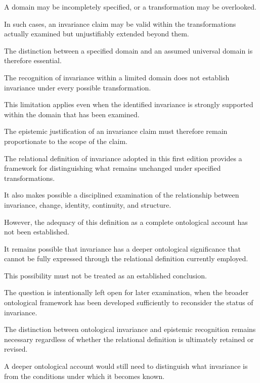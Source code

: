 A domain may be incompletely
specified, or a transformation
may be overlooked.

In such cases, an invariance
claim may be valid within
the transformations actually
examined but unjustifiably
extended beyond them.

The distinction between
a specified domain and an
assumed universal domain
is therefore essential.

The recognition of invariance
within a limited domain does
not establish invariance
under every possible transformation.

This limitation applies even
when the identified invariance
is strongly supported within
the domain that has been
examined.

The epistemic justification
of an invariance claim must
therefore remain proportionate
to the scope of the claim.


The relational definition of
invariance adopted in this
first edition provides a
framework for distinguishing
what remains unchanged under
specified transformations.

It also makes possible a
disciplined examination of
the relationship between
invariance, change, identity,
continuity, and structure.

However, the adequacy of this
definition as a complete
ontological account has not
been established.

It remains possible that
invariance has a deeper
ontological significance
that cannot be fully expressed
through the relational
definition currently employed.

This possibility must not
be treated as an established
conclusion.

The question is intentionally
left open for later examination,
when the broader ontological
framework has been developed
sufficiently to reconsider
the status of invariance.

The distinction between
ontological invariance and
epistemic recognition remains
necessary regardless of whether
the relational definition is
ultimately retained or revised.

A deeper ontological account
would still need to distinguish
what invariance is from the
conditions under which it
becomes known.


